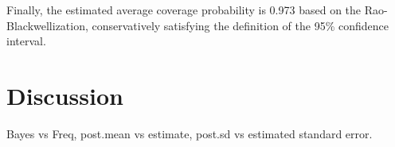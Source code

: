 \documentclass[article]{jss}
\begin{document}
Finally, the estimated average coverage probability is 0.973 based on the Rao-Blackwellization, conservatively satisfying the definition of the 95\% confidence interval. 
\\





\section[Discussion]{Discussion}
Bayes vs Freq, post.mean vs estimate, post.sd vs estimated standard error.
\end{document}
